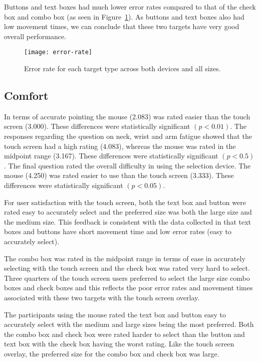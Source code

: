 \documentclass{elsart}
\begin{document}
Buttons and text boxes had much lower error rates compared to that of
the check box and combo box (as seen in Figure~\ref{fig-error-rate}). As
buttons and text boxes also had low movement times, we can conclude that
these two targets have very good overall performance.

\begin{figure}
	\texttt{[image: error-rate]}
	\caption{Error rate for each target type across both devices and all
	sizes.}
	\label{fig-error-rate}
\end{figure}


\subsection{Comfort}
\label{sec-results-comfort}

In terms of accurate pointing the mouse (2.083) was rated easier than
the touch screen (3.000). These differences were statistically
significant \((p < 0.01)\). The responses regarding the question on
neck, wrist and arm fatigue showed that the touch screen had a high
rating (4.083), whereas the mouse was rated in the midpoint range
(3.167). These differences were statistically significant \((p < 0.5)\).
The final question rated the overall difficulty in using the selection
device. The mouse (4.250) was rated easier to use than the touch screen
(3.333). These differences were statistically significant \((p <
0.05)\).

For user satisfaction with the touch screen, both the text box and
button were rated easy to accurately select and the preferred size was
both the large size and the medium size. This feedback is consistent
with the data collected in that text boxes and buttons have short
movement time and low error rates (easy to accurately select).

The combo box was rated in the midpoint range in terms of ease in
accurately selecting with the touch screen and the check box was rated
very hard to select. Three quarters of the touch screen users preferred
to select the large size combo boxes and check boxes and this reflects
the poor error rates and movement times associated with these two
targets with the touch screen overlay.

The participants using the mouse rated the text box and button easy to
accurately select with the medium and large sizes being the most
preferred. Both the combo box and check box were rated harder to select
than the button and text box with the check box having the worst rating.
Like the touch screen overlay, the preferred size for the combo box and
check box was large.
\end{document}
